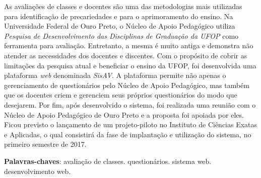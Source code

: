 \documentclass[
  12pt,       %
  openright,      %
  oneside,      %
  a4paper,      %
  english,      %
  french,        %
  spanish,     %
  brazil        %
  ]{abntex2-decsi}
\begin{document}

\setlength{\absparsep}{18pt} %
\begin{resumo}


As avaliações de classes e docentes são uma das metodologias mais utilizadas para identificação de precariedades e para o aprimoramento do ensino. Na Universidade Federal de Ouro Preto, o Núcleo de Apoio Pedagógico utiliza \textit{Pesquisa de Desenvolvimento das Disciplinas de Graduação da UFOP} como ferramenta para avaliação. Entretanto, a mesma é muito antiga e demonstra não atender as necessidades dos docentes e discentes. Com o propósito de cobrir as limitações da pesquisa atual e beneficiar o ensino da UFOP, foi desenvolvida uma plataforma \textit{web} denominada \textit{SisAV}. A plataforma permite não apenas o gerenciamento de questionários pelo Núcleo de Apoio Pedagógico, mas também que os docentes criem e gerenciem seus próprios questionários do modo que desejarem. Por fim, após desenvolvido o sistema, foi realizada uma reunião com o Núcleo de Apoio Pedagógico de Ouro Preto e a proposta foi apoiada por eles. Ficou previsto o lançamento de um projeto-piloto no Instituto de Ciências Exatas e Aplicadas, o qual consistirá da fase de implantação e utilização do sistema, no primeiro semestre de 2017.

\textbf{Palavras-chaves}: avaliação de classes. questionários. sistema web. desenvolvimento web.
\end{resumo}
\end{document}
